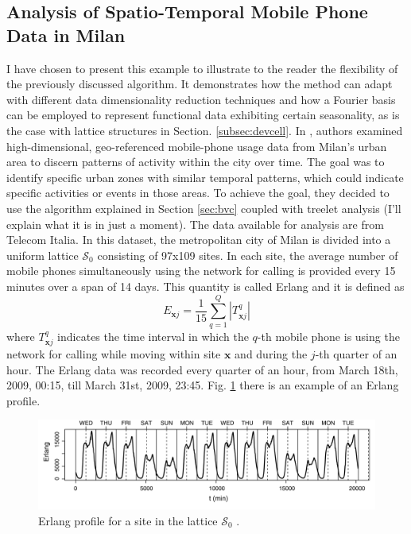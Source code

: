\subsection{Analysis of Spatio-Temporal Mobile Phone Data in Milan}
\label{subsec:mobilephonemilan}
I have chosen to present this example to illustrate to the reader the flexibility of the previously discussed algorithm. It demonstrates how the method can adapt with different data dimensionality reduction techniques and how a Fourier basis can be employed to represent functional data exhibiting certain seasonality, as is the case with lattice structures in Section. \ref{subsec:devcell}.
In \citeauthor{secchi_analysis_2015} \citeyear{secchi_analysis_2015}, authors examined high-dimensional, geo-referenced mobile-phone usage data from Milan's urban area to discern patterns of activity within the city over time. The goal was to identify specific urban zones with similar temporal patterns, which could indicate specific activities or events in those areas. To achieve the goal, they decided to use the algorithm explained in Section \ref{sec:bvc} coupled with treelet analysis (I'll explain what it is in just a moment). 
The data available for analysis are from Telecom Italia. In this dataset, the metropolitan city of Milan is divided into a uniform lattice $\mathcal{S}_0$ consisting of 97x109 sites. In each site, the average number of mobile phones simultaneously using the network for calling is provided every 15 minutes over a span of 14 days. This quantity is called Erlang and it is defined as
\begin{equation}
    \label{eq:erlang}
    E_{\mathbf{x}j}=\frac{1}{15}\sum_{q=1}^Q \left| T_{\mathbf{x}j}^q \right|
\end{equation}
where $T_{\mathbf{x}j}^q$ indicates the time interval in which the $q$-th mobile phone is using the network for calling while moving within site $\mathbf{x}$ and during the $j$-th quarter of an hour. The Erlang data was recorded every quarter of an hour, from March 18th, 2009, 00:15, till March 31st, 2009, 23:45. Fig. \ref{fig:secchino} there is an example of an Erlang profile.
\begin{figure}[H]
    \centering
    \includegraphics[scale=0.43]{Images/secchierlang.png}
    \caption[Erlang profile.]{Erlang profile for a site in the lattice $\mathcal{S}_0$ \cite{secchi_analysis_2015}.}
    \label{fig:secchino}
\end{figure}
